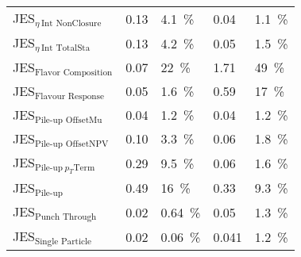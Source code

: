 \begin{center}
\begin{tabular}{>{}m{5.0cm}>{}m{2.5cm}>{}m{2.0cm} >{}m{2.5cm}>{}m{1.0cm}}
JES$_{\eta ~\text{Int NonClosure}}$ & 0.13 & 4.1~\% & 0.04 &  1.1~\% \\

JES$_{\eta ~\text{Int TotalSta}}$ & 0.13 &  4.2~\% & 0.05 &  1.5~\% \\

JES$_{\text{Flavor Composition}}$ & 0.07 &  22~\% & 1.71 & 49~\%  \\


JES$_{\text{Flavour Response} }$& 0.05&  1.6~\% & 0.59 &  17~\% \\


JES$_{\text{Pile-up OffsetMu}}$ & 0.04 &  1.2~\% & 0.04 &  1.2~\%\\

JES$_{\text{Pile-up OffsetNPV}} $& 0.10 &  3.3~\% & 0.06 &  1.8~\%\\


JES$_{ \text{Pile-up}~p_T \text{Term}}$ & 0.29&  9.5~\% & 0.06 &  1.6~\%\\

JES$_{\text{Pile-up}}$& 0.49 &  16~\% & 0.33 &  9.3~\%\\


JES$_{\text{Punch Through}} $& 0.02 &  0.64~\% & 0.05 &  1.3~\%\\

JES$_{\text{Single Particle}} $ & 0.02 &  0.06~\%  &0.041 &  1.2~\%\\
	\bottomrule
	\end{tabular}
	
\end{center}



